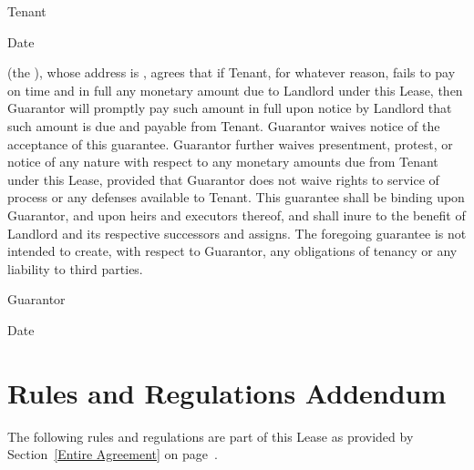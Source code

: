 \documentclass{article}
\begin{document}
\begin{signatureBlock}
  Tenant

  \signatureLine{}

  \tenantName\hfill Date
\end{signatureBlock}

\vfill

\emph{\guarantorName} (the ), whose address is
\emph{\guarantorAddress}, agrees that if Tenant, for whatever reason, fails to
pay on time and in full any monetary amount due to Landlord under this Lease,
then Guarantor will promptly pay such amount in full upon notice by Landlord
that such amount is due and payable from Tenant. Guarantor waives notice of the
acceptance of this guarantee. Guarantor further waives presentment, protest, or
notice of any nature with respect to any monetary amounts due from Tenant under
this Lease, provided that Guarantor does not waive rights to service of process
or any defenses available to Tenant. This guarantee shall be binding upon
Guarantor, and upon heirs and executors thereof, and shall inure to the benefit
of Landlord and its respective successors and assigns. The foregoing guarantee
is not intended to create, with respect to Guarantor, any obligations of tenancy
or any liability to third parties.

\begin{signatureBlock}
  Guarantor

  \signatureLine{}

  \guarantorName\hfill Date
\end{signatureBlock}

\clearpage %

\section*{Rules and Regulations Addendum}

The following rules and regulations are part of this Lease as provided by
Section~\ref{Entire Agreement} on page~\pageref{Entire Agreement}.
\end{document}
